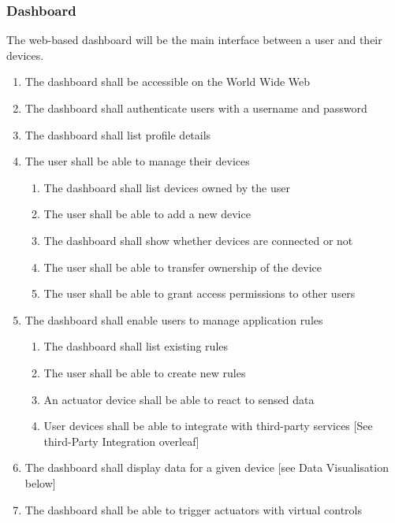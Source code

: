       \subsubsection{Dashboard}
        The web-based dashboard will be the main interface between a user and their devices.

        \begin{enumerate}
          \item The dashboard shall be accessible on the World Wide Web
          \item The dashboard shall authenticate users with a username and password
          \item The dashboard shall list profile details
          \item The user shall be able to manage their devices
          \begin{enumerate}
            \item The dashboard shall list devices owned by the user
            \item The user shall be able to add a new device
            \item The dashboard shall show whether devices are connected or not
            \item The user shall be able to transfer ownership of the device
            \item The user shall be able to grant access permissions to other users
          \end{enumerate}
          \item The dashboard shall enable users to manage application rules
          \begin{enumerate}
            \item The dashboard shall list existing rules
            \item The user shall be able to create new rules
            \item An actuator device shall be able to react to sensed data
            \item User devices shall be able to integrate with third-party services [See third-Party Integration overleaf]
          \end{enumerate}
          \item The dashboard shall display data for a given device [see Data Visualisation below]
          \item The dashboard shall be able to trigger actuators with virtual controls
        \end{enumerate}

